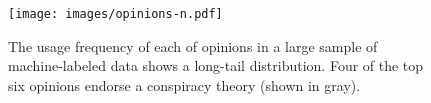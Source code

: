 
\begin{figure}[!tbp]
	\centering
	\texttt{[image: images/opinions-n.pdf]}
	\caption{
        The usage frequency of each of opinions in a large sample of machine-labeled data shows a long-tail distribution.
        Four of the top six opinions endorse a conspiracy theory (shown in gray).
	}
	\label{fig:opinion-n}
\end{figure}